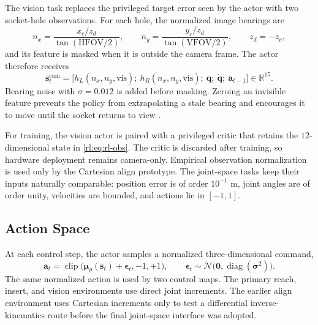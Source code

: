 The vision task replaces the privileged target error seen by the actor with two socket-hole observations. For each hole, the normalized image bearings are
\begin{equation*}
 n_x=\frac{x_c/z_d}{\tan(\mathrm{HFOV}/2)},\qquad
 n_y=\frac{y_c/z_d}{\tan(\mathrm{VFOV}/2)},\qquad z_d=-z_c,
\end{equation*}
and its feature is masked when it is outside the camera frame. The actor therefore receives
\begin{equation*}
\bm{s}_t^{\mathrm{cam}}=\big[h_L(n_x,n_y,\mathrm{vis});\ h_R(n_x,n_y,\mathrm{vis});\ \bm{q};\ \dot{\bm{q}};\ \bm{a}_{t-1}\big]\in\mathbb{R}^{15}.
\end{equation*}
Bearing noise with $\sigma=0.012$ is added before masking. Zeroing an invisible feature prevents the policy from extrapolating a stale bearing and encourages it to move until the socket returns to view \cite{lin_2022_centerpose,schoettler_2020_industrial,spector_2021_insertionnet}.

For training, the vision actor is paired with a privileged critic that retains the $12$-dimensional state in \eqref{rl:eq:rl-obs}. The critic is discarded after training, so hardware deployment remains camera-only. Empirical observation normalization is used only by the Cartesian align prototype. The joint-space tasks keep their inputs naturally comparable: position error is of order $10^{-1}$ m, joint angles are of order unity, velocities are bounded, and actions lie in $[-1,1]$.

\rlFloatBarrier

\subsection{Action Space}\label{rl:sec:rl-act}

At each control step, the actor samples a normalized three-dimensional command,
\begin{equation*}
\bm{a}_t=\operatorname{clip}\!\big(\bm{\mu}_{\theta}(\bm{s}_t)+\bm{\epsilon}_t,-1,+1\big),
\qquad \bm{\epsilon}_t\sim\mathcal{N}\!\big(\bm0,\operatorname{diag}(\bm{\sigma}^2)\big).
\end{equation*}
The same normalized action is used by two control maps. The primary reach, insert, and vision environments use direct joint increments. The earlier align environment uses Cartesian increments only to test a differential inverse-kinematics route before the final joint-space interface was adopted.

